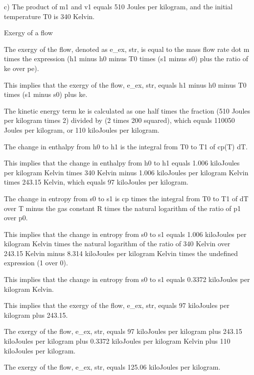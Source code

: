 c) The product of m1 and v1 equals 510 Joules per kilogram, and the initial temperature T0 is 340 Kelvin.

Exergy of a flow

The exergy of the flow, denoted as e_ex, str, is equal to the mass flow rate dot m times the expression (h1 minus h0 minus T0 times (s1 minus s0) plus the ratio of ke over pe).

This implies that the exergy of the flow, e_ex, str, equals h1 minus h0 minus T0 times (s1 minus s0) plus ke.

The kinetic energy term ke is calculated as one half times the fraction (510 Joules per kilogram times 2) divided by (2 times 200 squared), which equals 110050 Joules per kilogram, or 110 kiloJoules per kilogram.

The change in enthalpy from h0 to h1 is the integral from T0 to T1 of cp(T) dT.

This implies that the change in enthalpy from h0 to h1 equals 1.006 kiloJoules per kilogram Kelvin times 340 Kelvin minus 1.006 kiloJoules per kilogram Kelvin times 243.15 Kelvin, which equals 97 kiloJoules per kilogram.

The change in entropy from s0 to s1 is cp times the integral from T0 to T1 of dT over T minus the gas constant R times the natural logarithm of the ratio of p1 over p0.

This implies that the change in entropy from s0 to s1 equals 1.006 kiloJoules per kilogram Kelvin times the natural logarithm of the ratio of 340 Kelvin over 243.15 Kelvin minus 8.314 kiloJoules per kilogram Kelvin times the undefined expression (1 over 0).

This implies that the change in entropy from s0 to s1 equals 0.3372 kiloJoules per kilogram Kelvin.

This implies that the exergy of the flow, e_ex, str, equals 97 kiloJoules per kilogram plus 243.15.

The exergy of the flow, e_ex, str, equals 97 kiloJoules per kilogram plus 243.15 kiloJoules per kilogram plus 0.3372 kiloJoules per kilogram Kelvin plus 110 kiloJoules per kilogram.

The exergy of the flow, e_ex, str, equals 125.06 kiloJoules per kilogram.